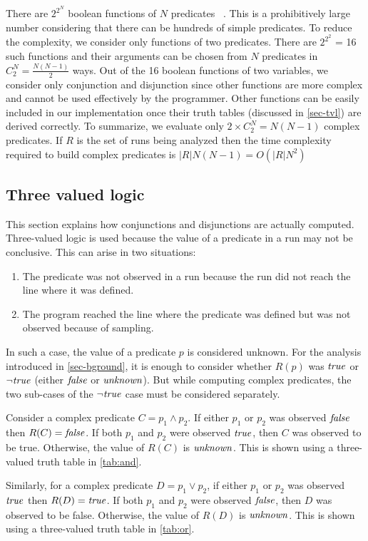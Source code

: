 There are $2^{2^N}$ boolean functions of $N$ predicates ~\cite{MathWorld:BoolFuncs}.  This is a prohibitively large number considering that there can be hundreds of simple predicates.  To reduce the complexity, we consider only functions of two predicates.  There are $2^{2^2}$ = 16 such functions and their arguments can be chosen from $N$ predicates in $C^N_2 = \frac{N(N-1)}{2}$ ways.  Out of the 16 boolean functions of two variables, we consider only conjunction and disjunction since other functions are more complex and cannot be used effectively by the programmer.  Other functions can be easily included in our implementation once their truth tables (discussed in \autoref{sec-tvl}) are derived correctly.  To summarize, we evaluate only $2 \times C^N_2 = N(N-1)$ complex predicates.  If $R$ is the set of runs being analyzed then the time complexity required to build complex predicates is $|R|N(N-1) = O(|R|N^2)$

\subsection{Three valued logic}
\label{sec-tvl}
This section explains how conjunctions and disjunctions are actually computed.  Three-valued logic is used because the value of a predicate in a run may not be conclusive. This can arise in two situations:
\begin{enumerate}
\item The predicate was not observed in a run because the run did not reach the line where it was defined.
\item The program reached the line where the predicate was defined but was not observed because of sampling.
\end{enumerate}

In such a case, the value of a predicate $p$ is considered unknown.  For the analysis introduced in \autoref{sec-bground}, it is enough to consider whether $R(p)$ was $\mathit{true}$ or $\neg \mathit{true}$ (either $\mathit{false}$ or $\mathit{unknown}$).  But while computing complex predicates, the two sub-cases of the $\neg \mathit{true}$ case must be considered separately.

Consider a complex predicate $C = p_1 \wedge p_2$.  If either $p_1$ or $p_2$ was observed $\mathit{false}$ then $R(C) = \mathit{false}$.  If both $p_1$ and $p_2$ were observed $\mathit{true}$, then $C$ was observed to be true.  Otherwise, the value of $R(C)$ is $\mathit{unknown}$.  This is shown using a three-valued truth table in \autoref{tab:and}.

Similarly, for a complex predicate $D = p_1 \vee p_2$, if either $p_1$ or $p_2$ was observed $\mathit{true}$ then $R(D) = \mathit{true}$.  If both $p_1$ and $p_2$ were observed $\mathit{false}$, then $D$ was observed to be false.  Otherwise, the value of $R(D)$ is $\mathit{unknown}$.  This is shown using a three-valued truth table in \autoref{tab:or}.

